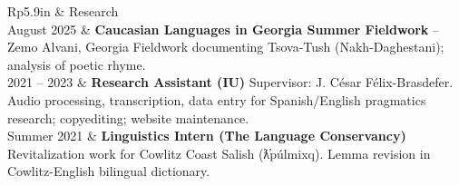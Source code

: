 \documentclass[letterpaper, 11pt]{article}
\newcommand{\headingfont}{\Large\color{accentcolor}}
\newenvironment{SectionTable}[1]{
	\setlength{\LTpre}{0pt}
	\setlength{\LTpost}{0pt}
	\renewcommand*{\arraystretch}{1.4}
	\setlength{\tabcolsep}{10pt}
	\begin{longtable}{Rp{5.9in}} & #1 \\}
{\end{longtable}\vspace{0.25cm}}
\begin{document}

\begin{SectionTable}{\headingfont Research}
	August 2025 &
	\textbf{Caucasian Languages in Georgia Summer Fieldwork} -- Zemo Alvani, Georgia \newline
	Fieldwork documenting Tsova-Tush (Nakh-Daghestani); analysis of poetic rhyme. \\

	2021 -- 2023 &
	\textbf{Research Assistant (IU)} \newline
	Supervisor: J. César Félix-Brasdefer. \newline
	Audio processing, transcription, data entry for Spanish/English pragmatics research; copyediting; website maintenance. \\

	Summer 2021 &
	\textbf{Linguistics Intern (The Language Conservancy)} \newline
	Revitalization work for Cowlitz Coast Salish (ƛ̕púlmixq). Lemma revision in Cowlitz-English bilingual dictionary.
\end{SectionTable}

\end{document}
